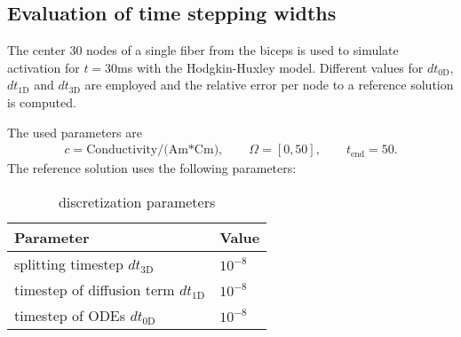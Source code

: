 %
\clearpage
%
%
%
%
\begin{frame}
 \section{Evaluation of time stepping widths}
   The center 30 nodes of a single fiber from the biceps is used to simulate activation for $t=30$ms with the Hodgkin-Huxley model.
   Different values for $dt_\text{0D}$, $dt_\text{1D}$ and $dt_\text{3D}$ are employed and the relative error per node to a reference solution is computed.
  
  The used parameters are
  \begin{equation*}
    \begin{array}{lll}
      c = \text{Conductivity/(Am*Cm)},\qquad \Omega = [0,50], \qquad t_\text{end}=50.
    \end{array}
  \end{equation*}
  The reference solution uses the following parameters:
  \begin{table}[h!]
    \begin{center}
      \begin{tabular}{l|l}
        \textbf{Parameter} & \textbf{Value}\\
        \hline
        splitting timestep $dt_\text{3D}$ & $10^{-8}$\\
        timestep of diffusion term $dt_\text{1D}$ & $10^{-8}$\\
        timestep of ODEs $dt_\text{0D}$ & $10^{-8}$
      \end{tabular}
    \end{center}
    \caption{discretization parameters}
    \label{tab:table_monodomain2}
  \end{table}
\end{frame}
%
%
%
%
